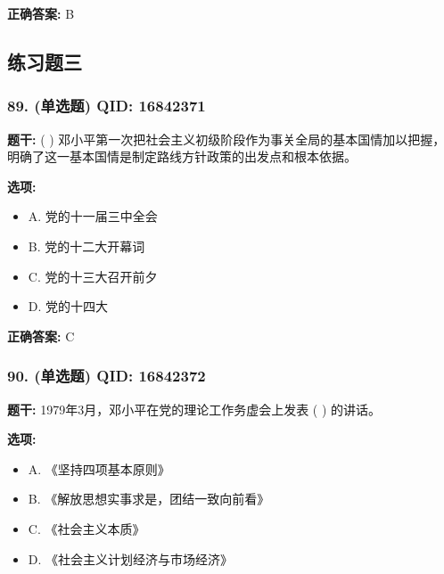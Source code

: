 \documentclass[12pt,UTF8]{ctexart}
\begin{document}
\textbf{正确答案:}
B

\vspace{0.3em}\hrulefill\vspace{0.7em}

\subsection*{练习题三}

\subsubsection*{89. (单选题) \small QID: 16842371}

\textbf{题干:}
( ) 邓小平第一次把社会主义初级阶段作为事关全局的基本国情加以把握，明确了这一基本国情是制定路线方针政策的出发点和根本依据。

\textbf{选项:}
\begin{itemize}[leftmargin=*]

  \item A. 党的十一届三中全会

  \item B. 党的十二大开幕词

  \item C. 党的十三大召开前夕

  \item D. 党的十四大

\end{itemize}

\textbf{正确答案:}
C

\vspace{0.3em}\hrulefill\vspace{0.7em}

\subsubsection*{90. (单选题) \small QID: 16842372}

\textbf{题干:}
1979年3月，邓小平在党的理论工作务虚会上发表 ( ) 的讲话。

\textbf{选项:}
\begin{itemize}[leftmargin=*]

  \item A. 《坚持四项基本原则》

  \item B. 《解放思想实事求是，团结一致向前看》

  \item C. 《社会主义本质》

  \item D. 《社会主义计划经济与市场经济》

\end{itemize}
\end{document}
